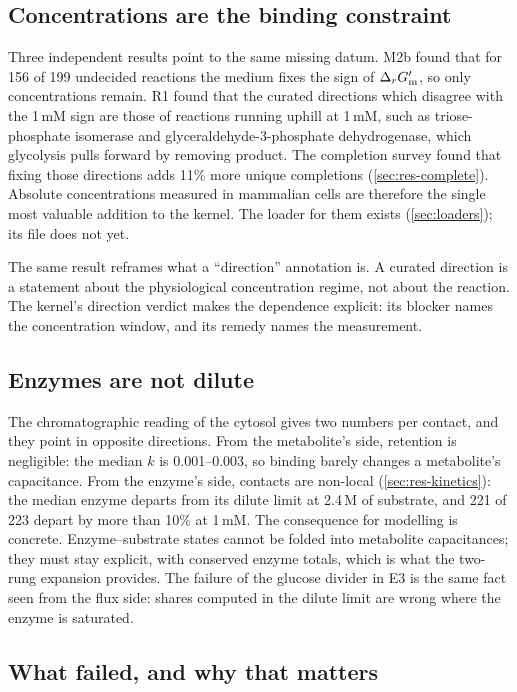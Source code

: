 \subsection{Concentrations are the binding constraint}
\label{sec:disc-conc}

Three independent results point to the same missing datum.
M2b found that for 156 of 199 undecided reactions the medium fixes the sign of $\Delta_r G'_{\mathrm{m}}$, so only concentrations remain.
R1 found that the curated directions which disagree with the 1\,mM sign are those of reactions running uphill at 1\,mM, such as triose-phosphate isomerase and glyceraldehyde-3-phosphate dehydrogenase, which glycolysis pulls forward by removing product.
The completion survey found that fixing those directions adds 11\% more unique completions (\cref{sec:res-complete}).
Absolute concentrations measured in mammalian cells \citep{park2016concentrations} are therefore the single most valuable addition to the kernel.
The loader for them exists (\cref{sec:loaders}); its file does not yet.

The same result reframes what a ``direction'' annotation is.
A curated direction is a statement about the physiological concentration regime, not about the reaction.
The kernel's direction verdict makes the dependence explicit: its blocker names the concentration window, and its remedy names the measurement.

\subsection{Enzymes are not dilute}
\label{sec:disc-locality}

The chromatographic reading of the cytosol gives two numbers per contact, and they point in opposite directions.
From the metabolite's side, retention is negligible: the median $k$ is 0.001--0.003, so binding barely changes a metabolite's capacitance.
From the enzyme's side, contacts are non-local (\cref{sec:res-kinetics}): the median enzyme departs from its dilute limit at 2.4\,\textmu M of substrate, and 221 of 223 depart by more than 10\% at 1\,mM.
The consequence for modelling is concrete.
Enzyme--substrate states cannot be folded into metabolite capacitances; they must stay explicit, with conserved enzyme totals, which is what the two-rung expansion provides.
The failure of the glucose divider in E3 is the same fact seen from the flux side: shares computed in the dilute limit are wrong where the enzyme is saturated.

\subsection{What failed, and why that matters}
\label{sec:disc-negative}

